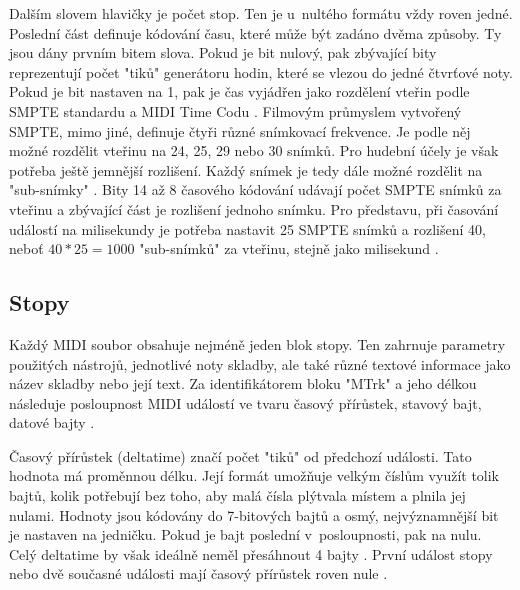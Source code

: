 Dalším slovem hlavičky je počet stop.
Ten je u~nultého formátu vždy roven jedné.
Poslední část definuje kódování času, 
které může být zadáno dvěma způsoby.
Ty jsou dány prvním bitem slova.
Pokud je bit nulový, 
pak zbývající bity reprezentují počet "tiků" generátoru hodin, 
které se vlezou do jedné čtvrťové noty.
Pokud je bit nastaven na 1, 
pak je čas vyjádřen jako rozdělení vteřin podle SMPTE standardu
a MIDI Time Codu
\cite{Back_SMF_Specif}.
Filmovým průmyslem vytvořený SMPTE, mimo jiné, 
definuje čtyři různé snímkovací frekvence.
Je podle něj možné rozdělit vteřinu na 24, 25, 29 nebo 30 snímků.
Pro hudební účely je však potřeba ještě jemnější rozlišení.
Každý snímek je tedy dále možné rozdělit na "sub-snímky"
\cite{Glatt_aboutMIDIFiles}.
Bity 14 až 8 časového kódování udávají počet SMPTE snímků za vteřinu 
a zbývající část je rozlišení jednoho snímku.
Pro představu,
při časování událostí na milisekundy je potřeba nastavit 25 SMPTE snímků
a rozlišení 40, neboť $ 40 * 25 = 1000 $ "sub-snímků" za vteřinu, 
stejně jako milisekund 
\cite{Back_SMF_Specif}.
\par

\subsection{Stopy}
Každý MIDI soubor obsahuje nejméně jeden blok stopy.
Ten zahrnuje parametry použitých nástrojů, jednotlivé noty skladby, 
ale také různé textové informace jako název skladby nebo její text.
Za identifikátorem bloku "MTrk" a jeho délkou 
následuje posloupnost MIDI událostí
ve tvaru časový přírůstek, stavový bajt, datové bajty
\cite{Back_SMF_Specif}.
\par

Časový přírůstek (deltatime) značí počet "tiků" od předchozí události.
Tato hodnota má proměnnou délku.
Její formát umožňuje velkým číslům využít tolik bajtů, 
kolik potřebují bez toho,
aby malá čísla plýtvala místem a plnila jej nulami.
Hodnoty jsou kódovány do 7-bitových bajtů 
a osmý, nejvýznamnější bit je nastaven na jedničku.
Pokud je bajt poslední v~posloupnosti, pak na nulu.
Celý deltatime by však ideálně neměl přesáhnout 4 bajty
\cite{Glatt_aboutMIDIFiles}.
První událost stopy nebo dvě současné události 
mají časový přírůstek roven nule
\cite{Back_SMF_Specif}.
\par

